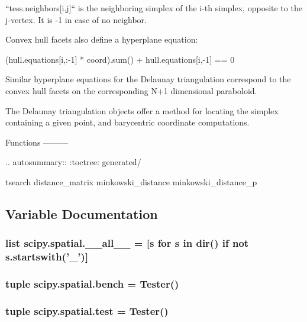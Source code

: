 \begin{DoxyVerb}
    ``tess.neighbors[i,j]`` is the neighboring simplex of the i-th
    simplex, opposite to the j-vertex. It is -1 in case of no
    neighbor.

Convex hull facets also define a hyperplane equation:

    (hull.equations[i,:-1] * coord).sum() + hull.equations[i,-1] == 0

Similar hyperplane equations for the Delaunay triangulation correspond
to the convex hull facets on the corresponding N+1 dimensional
paraboloid.

The Delaunay triangulation objects offer a method for locating the
simplex containing a given point, and barycentric coordinate
computations.

Functions
---------

.. autosummary::
   :toctree: generated/

   tsearch
   distance_matrix
   minkowski_distance
   minkowski_distance_p\end{DoxyVerb}
 

\subsection{Variable Documentation}
\hypertarget{namespacescipy_1_1spatial_a20fc1ad122cc3a448b249c5d924fc5c0}{}
\subsubsection[{\+\_\+\+\_\+all\+\_\+\+\_\+}]{\setlength{\rightskip}{0pt plus 5cm}list scipy.\+spatial.\+\_\+\+\_\+all\+\_\+\+\_\+ = \mbox{[}{\bf s} for {\bf s} in dir() {\bf if} not s.\+startswith('\+\_\+')\mbox{]}}\label{namespacescipy_1_1spatial_a20fc1ad122cc3a448b249c5d924fc5c0}
\hypertarget{namespacescipy_1_1spatial_a5b7d767a9ff3163062223a0372e4b3fe}{}
\subsubsection[{bench}]{\setlength{\rightskip}{0pt plus 5cm}tuple scipy.\+spatial.\+bench = Tester()}\label{namespacescipy_1_1spatial_a5b7d767a9ff3163062223a0372e4b3fe}
\hypertarget{namespacescipy_1_1spatial_a9a201637fcd0d98a27b5a6f80349abe2}{}
\subsubsection[{test}]{\setlength{\rightskip}{0pt plus 5cm}tuple scipy.\+spatial.\+test = Tester()}\label{namespacescipy_1_1spatial_a9a201637fcd0d98a27b5a6f80349abe2}
